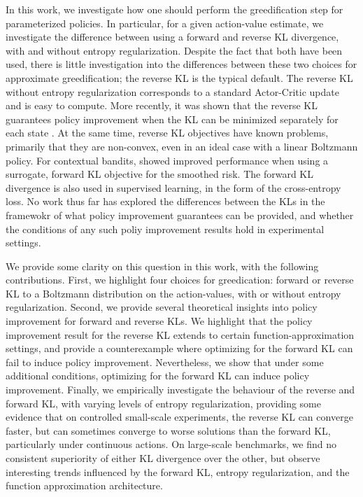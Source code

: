 \documentclass[twoside,11pt]{article}
\begin{document}
In this work, we investigate how one should perform the greedification step for parameterized policies. In particular, for a given action-value estimate, we investigate the difference between using a forward and reverse KL divergence, with and without entropy regularization. 
Despite the fact that both have been used, there is little investigation into the differences between these two choices for approximate greedification; the reverse KL is the typical default. The reverse KL without entropy regularization corresponds to a standard Actor-Critic update and is easy to compute. More recently, it was shown that the reverse KL guarantees policy improvement when the KL can be minimized separately for each state \citep[p.~4]{haarnoja2018soft}. At the same time, reverse KL objectives have known problems, primarily that they are non-convex, even in an ideal case with a linear Boltzmann policy. For contextual bandits, \citet{chen2019surrogate} showed improved performance when using a surrogate, forward KL objective for the smoothed risk. The forward KL divergence is also used in supervised learning, in the form of the cross-entropy loss. No work thus far has explored the differences between the KLs in the framewokr of what policy improvement guarantees can be provided, and whether the conditions of any such poliy improvement results hold in experimental settings.

We provide some clarity on this question in this work, with the following contributions. First, we highlight four choices for greedication: forward or reverse KL to a Boltzmann distribution on the action-values, with or without entropy regularization. 
Second, we provide several theoretical insights into policy improvement for forward and reverse KLs. We highlight that the policy improvement result for the reverse KL extends to certain function-approximation settings, and provide a counterexample where optimizing for the forward KL can fail to induce policy improvement. Nevertheless, we show that under some additional conditions, optimizing for the forward KL can induce policy improvement.  Finally, we empirically investigate the behaviour of the reverse and forward KL, with varying levels of entropy regularization, providing some evidence that on controlled small-scale experiments, the reverse KL can converge faster, but can sometimes converge to worse solutions than the forward KL, particularly under continuous actions. On large-scale benchmarks, we find no consistent superiority of either KL divergence over the other, but observe interesting trends influenced by the forward KL, entropy regularization, and the function approximation architecture.
\end{document}
